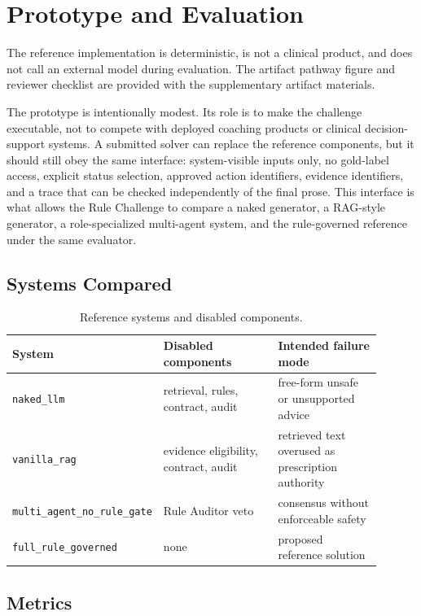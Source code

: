\documentclass{ceurart}
\begin{document}
\section{Prototype and Evaluation}

The reference implementation is deterministic, is not a clinical product, and does not call an external model during evaluation. The artifact pathway figure and reviewer checklist are provided with the supplementary artifact materials.

The prototype is intentionally modest. Its role is to make the challenge executable, not to compete with deployed coaching products or clinical decision-support systems. A submitted solver can replace the reference components, but it should still obey the same interface: system-visible inputs only, no gold-label access, explicit status selection, approved action identifiers, evidence identifiers, and a trace that can be checked independently of the final prose. This interface is what allows the Rule Challenge to compare a naked generator, a RAG-style generator, a role-specialized multi-agent system, and the rule-governed reference under the same evaluator.

\subsection{Systems Compared}

\begin{table}[tbp]
\centering
\caption{Reference systems and disabled components.}
\label{tab:systems}
\begin{tabular}{p{0.31\linewidth}p{0.31\linewidth}p{0.28\linewidth}}
\toprule
System & Disabled components & Intended failure mode \\
\midrule
\texttt{naked\_llm} & retrieval, rules, contract, audit & free-form unsafe or unsupported advice \\
\texttt{vanilla\_rag} & evidence eligibility, contract, audit & retrieved text overused as prescription authority \\
\texttt{multi\_agent\_no\_rule\_gate} & Rule Auditor veto & consensus without enforceable safety \\
\texttt{full\_rule\_governed} & none & proposed reference solution \\
\bottomrule
\end{tabular}
\end{table}

\subsection{Metrics}
\end{document}
